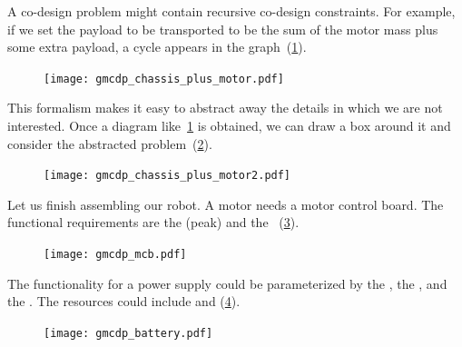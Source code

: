 \begin{example}

\noindent A co-design problem might contain recursive co-design constraints.
For example, if we set the payload to be transported to be the sum
of the motor mass plus some extra payload, a cycle appears in the
graph~(\cref{fig:gmcdp_chassis_plus_motor}). 


\begin{figure}[h]
\centering{}\texttt{[image: gmcdp\_chassis\_plus\_motor.pdf]}
\caption{\label{fig:gmcdp_chassis_plus_motor}}
\end{figure}

This formalism makes it easy to abstract away the details
in which we are not interested. Once a diagram like~\cref{fig:gmcdp_chassis_plus_motor}
is obtained, we can draw a box around it and consider the abstracted
problem~(\cref{fig:gmcdp_chassis_plus_motor-1}). 

\begin{figure}[h]
    \centering
    \texttt{[image: gmcdp\_chassis\_plus\_motor2.pdf]}
    \caption{\label{fig:gmcdp_chassis_plus_motor-1}}
\end{figure}


\label{exa:finish}Let us finish assembling our robot. A motor needs
a motor control board. The functional requirements are the (peak)
 and the ~(\cref{fig:mcb}).

\begin{figure}[h]
    \centering
    \texttt{[image: gmcdp\_mcb.pdf]}
    \caption{\label{fig:mcb}}
\end{figure}


\noindent The functionality for a power supply could be parameterized
by the , the , and the .
The resources could include  and  (\cref{fig:example-ba}).

\begin{figure}[h]
    \centering
    \texttt{[image: gmcdp\_battery.pdf]}
    \caption{\label{fig:example-ba}}
\end{figure}



\end{example}
